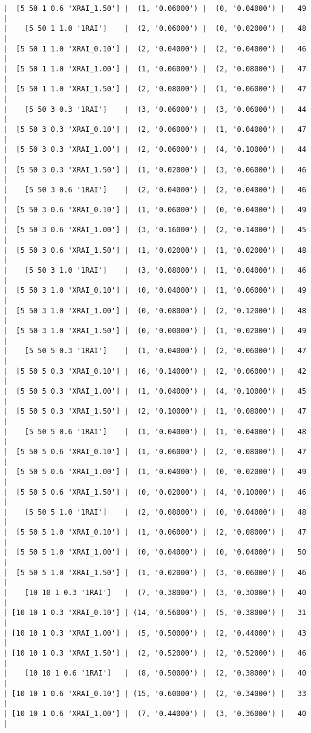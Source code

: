 \documentclass{article}
\begin{document}
\begin{verbatim}
|  [5 50 1 0.6 'XRAI_1.50'] |  (1, '0.06000') |  (0, '0.04000') |   49  |
|    [5 50 1 1.0 '1RAI']    |  (2, '0.06000') |  (0, '0.02000') |   48  |
|  [5 50 1 1.0 'XRAI_0.10'] |  (2, '0.04000') |  (2, '0.04000') |   46  |
|  [5 50 1 1.0 'XRAI_1.00'] |  (1, '0.06000') |  (2, '0.08000') |   47  |
|  [5 50 1 1.0 'XRAI_1.50'] |  (2, '0.08000') |  (1, '0.06000') |   47  |
|    [5 50 3 0.3 '1RAI']    |  (3, '0.06000') |  (3, '0.06000') |   44  |
|  [5 50 3 0.3 'XRAI_0.10'] |  (2, '0.06000') |  (1, '0.04000') |   47  |
|  [5 50 3 0.3 'XRAI_1.00'] |  (2, '0.06000') |  (4, '0.10000') |   44  |
|  [5 50 3 0.3 'XRAI_1.50'] |  (1, '0.02000') |  (3, '0.06000') |   46  |
|    [5 50 3 0.6 '1RAI']    |  (2, '0.04000') |  (2, '0.04000') |   46  |
|  [5 50 3 0.6 'XRAI_0.10'] |  (1, '0.06000') |  (0, '0.04000') |   49  |
|  [5 50 3 0.6 'XRAI_1.00'] |  (3, '0.16000') |  (2, '0.14000') |   45  |
|  [5 50 3 0.6 'XRAI_1.50'] |  (1, '0.02000') |  (1, '0.02000') |   48  |
|    [5 50 3 1.0 '1RAI']    |  (3, '0.08000') |  (1, '0.04000') |   46  |
|  [5 50 3 1.0 'XRAI_0.10'] |  (0, '0.04000') |  (1, '0.06000') |   49  |
|  [5 50 3 1.0 'XRAI_1.00'] |  (0, '0.08000') |  (2, '0.12000') |   48  |
|  [5 50 3 1.0 'XRAI_1.50'] |  (0, '0.00000') |  (1, '0.02000') |   49  |
|    [5 50 5 0.3 '1RAI']    |  (1, '0.04000') |  (2, '0.06000') |   47  |
|  [5 50 5 0.3 'XRAI_0.10'] |  (6, '0.14000') |  (2, '0.06000') |   42  |
|  [5 50 5 0.3 'XRAI_1.00'] |  (1, '0.04000') |  (4, '0.10000') |   45  |
|  [5 50 5 0.3 'XRAI_1.50'] |  (2, '0.10000') |  (1, '0.08000') |   47  |
|    [5 50 5 0.6 '1RAI']    |  (1, '0.04000') |  (1, '0.04000') |   48  |
|  [5 50 5 0.6 'XRAI_0.10'] |  (1, '0.06000') |  (2, '0.08000') |   47  |
|  [5 50 5 0.6 'XRAI_1.00'] |  (1, '0.04000') |  (0, '0.02000') |   49  |
|  [5 50 5 0.6 'XRAI_1.50'] |  (0, '0.02000') |  (4, '0.10000') |   46  |
|    [5 50 5 1.0 '1RAI']    |  (2, '0.08000') |  (0, '0.04000') |   48  |
|  [5 50 5 1.0 'XRAI_0.10'] |  (1, '0.06000') |  (2, '0.08000') |   47  |
|  [5 50 5 1.0 'XRAI_1.00'] |  (0, '0.04000') |  (0, '0.04000') |   50  |
|  [5 50 5 1.0 'XRAI_1.50'] |  (1, '0.02000') |  (3, '0.06000') |   46  |
|    [10 10 1 0.3 '1RAI']   |  (7, '0.38000') |  (3, '0.30000') |   40  |
| [10 10 1 0.3 'XRAI_0.10'] | (14, '0.56000') |  (5, '0.38000') |   31  |
| [10 10 1 0.3 'XRAI_1.00'] |  (5, '0.50000') |  (2, '0.44000') |   43  |
| [10 10 1 0.3 'XRAI_1.50'] |  (2, '0.52000') |  (2, '0.52000') |   46  |
|    [10 10 1 0.6 '1RAI']   |  (8, '0.50000') |  (2, '0.38000') |   40  |
| [10 10 1 0.6 'XRAI_0.10'] | (15, '0.60000') |  (2, '0.34000') |   33  |
| [10 10 1 0.6 'XRAI_1.00'] |  (7, '0.44000') |  (3, '0.36000') |   40  |

\end{verbatim}
\end{document}
